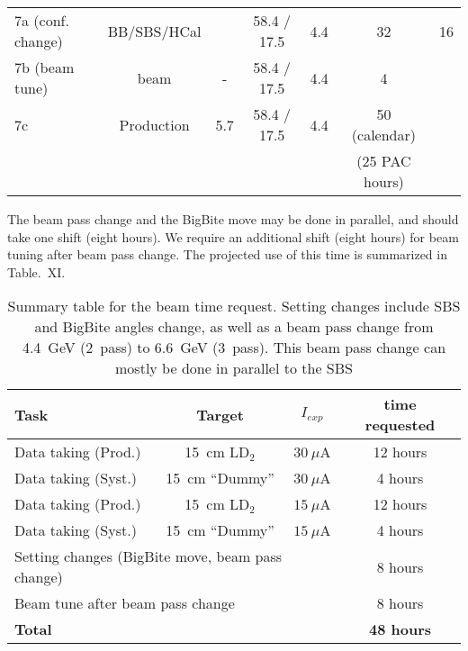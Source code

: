 \begin{table}[h]
\begin{tabular}{|l|c|c|c|c|c|c|}
\hline
\hline
7a (conf. change) & BB/SBS/HCal &  & 58.4 / 17.5 & 4.4 & 32 & 16 \\
7b (beam tune) & beam & - & 58.4 / 17.5 & 4.4 & 4 &  \\
7c  & Production & 5.7 & 58.4 / 17.5 & 4.4 & 50 (calendar) &  \\
 &  &  &  &  & (25 PAC hours) &  \\
\hline
\end{tabular} 
\end{table}
%
The beam pass change and the BigBite move may be done in parallel, and should take one shift (eight hours). We require an additional shift (eight hours) for beam tuning after beam pass change. 
The projected use of this time is summarized in Table.~XI.%
%
\begin{table}[h]
\caption{Summary table for the beam time request. Setting changes include SBS and BigBite angles change, as well as a beam pass change from 4.4~GeV (2~pass) to 6.6~GeV (3~pass). This beam pass change can mostly be done in parallel to the SBS}
\label{tab:beamtime}
\centering
\begin{tabular}{|l|c|c|c|}
\hline
Task & Target & $I_{exp}$ & time requested \\
\hline
Data taking (Prod.) & 15~cm LD$_2$ & $30~\mu$A & 12 hours \\ 
\hline
Data taking (Syst.) & 15~cm ``Dummy'' & $30~\mu$A & 4 hours \\ 
\hline
Data taking (Prod.) & 15~cm LD$_2$ & $15~\mu$A & 12 hours \\ 
\hline
Data taking (Syst.) & 15~cm ``Dummy'' & $15~\mu$A & 4 hours \\ 
\hline
\multicolumn{3}{|l|}{Setting changes (BigBite move, beam pass change)} & 8 hours \\
\multicolumn{3}{|l|}{Beam tune after beam pass change} & 8 hours \\
\hline
\hline
\multicolumn{3}{|l|}{\bf Total} & {\bf 48 hours} \\ 
\hline
\end{tabular} 
\end{table}

